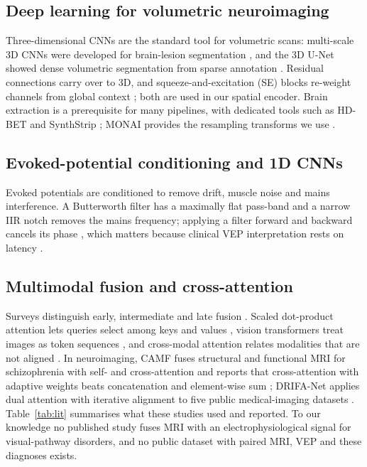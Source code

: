 \documentclass{ieeeaccessapprox}
\begin{document}
\subsection{Deep learning for volumetric neuroimaging}
Three-dimensional CNNs are the standard tool for volumetric scans: multi-scale 3D CNNs were developed for brain-lesion segmentation \cite{kamnitsas2017}, and the 3D U-Net showed dense volumetric segmentation from sparse annotation \cite{cicek2016}. Residual connections \cite{he2016} carry over to 3D, and squeeze-and-excitation (SE) blocks re-weight channels from global context \cite{hu2018}; both are used in our spatial encoder. Brain extraction is a prerequisite for many pipelines, with dedicated tools such as HD-BET \cite{isensee2019} and SynthStrip \cite{hoopes2022}; MONAI provides the resampling transforms we use \cite{cardoso2022}.

\subsection{Evoked-potential conditioning and 1D CNNs}
Evoked potentials are conditioned to remove drift, muscle noise and mains interference. A Butterworth filter has a maximally flat pass-band \cite{butterworth1930} and a narrow IIR notch removes the mains frequency; applying a filter forward and backward cancels its phase \cite{gustafsson1996,oppenheim2010}, which matters because clinical VEP interpretation rests on latency \cite{odom2016}.

\subsection{Multimodal fusion and cross-attention}
Surveys distinguish early, intermediate and late fusion \cite{baltrusaitis2019,ramachandram2017}. Scaled dot-product attention lets queries select among keys and values \cite{vaswani2017}, vision transformers treat images as token sequences \cite{dosovitskiy2021}, and cross-modal attention relates modalities that are not aligned \cite{tsai2019,lu2019}. In neuroimaging, CAMF fuses structural and functional MRI for schizophrenia with self- and cross-attention and reports that cross-attention with adaptive weights beats concatenation and element-wise sum \cite{zhou2024camf}; DRIFA-Net applies dual attention with iterative alignment to five public medical-imaging datasets \cite{dhar2025drifa}. Table~\ref{tab:lit} summarises what these studies used and reported. To our knowledge no published study fuses MRI with an electrophysiological signal for visual-pathway disorders, and no public dataset with paired MRI, VEP and these diagnoses exists.
\end{document}
